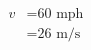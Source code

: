 \documentclass[preview]{standalone}
\begin{document}
\begin{align*}
v &= \text{60 mph}\\&= \text{26 m/s}
\end{align*}
\end{document}
